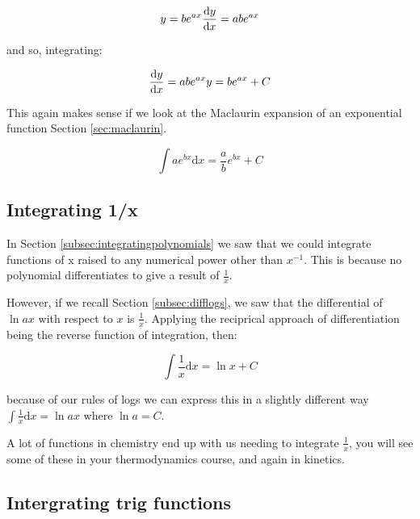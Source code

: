 \documentclass[
]{book}
\begin{document}
\begin{equation*}
y = be^{ax}\\
\frac{\textrm{d}y}{\textrm{d}x}=abe^{ax}
\end{equation*}

and so, integrating:

\begin{equation*}
\frac{\textrm{d}y}{\textrm{d}x}=abe^{ax}\\
y = be^{ax}+C
\end{equation*}

This again makes sense if we look at the Maclaurin expansion of an exponential function Section \ref{sec:maclaurin}.

\begin{equation}
\int ae^{bx} \textrm{d}x = \frac{a}{b}e^{bx}+C
\label{eq:intpoly}
\end{equation}

\hypertarget{subsec:integrating1x}{%
\subsection{Integrating 1/x}\label{subsec:integrating1x}}

In Section \ref{subsec:integratingpolynomials} we saw that we could integrate functions of x raised to any numerical power other than \(x^{-1}\). This is because no polynomial differentiates to give a result of \(\tfrac{1}{x}\).

However, if we recall Section \ref{subsec:difflogs}, we saw that the differential of \(\ln ax\) with respect to \(x\) is \(\tfrac{1}{x}\). Applying the reciprical approach of differentiation being the reverse function of integration, then:

\begin{equation}
\int \frac{1}{x} \textrm{d}x = \ln x + C
\label{eq:intln}
\end{equation}

because of our rules of logs we can express this in a slightly different way \(\int \frac{1}{x} \textrm{d}x = \ln ax\) where \(\ln a = C\).

A lot of functions in chemistry end up with us needing to integrate \(\tfrac{1}{x}\), you will see some of these in your thermodynamics course, and again in kinetics.

\hypertarget{subsec:}{%
\subsection{Intergrating trig functions}\label{subsec:}}
\end{document}
